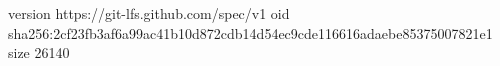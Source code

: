version https://git-lfs.github.com/spec/v1
oid sha256:2cf23fb3af6a99ac41b10d872cdb14d54ec9cde116616adaebe85375007821e1
size 26140
